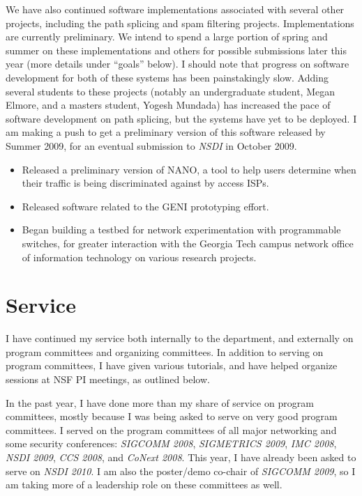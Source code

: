 \begin{sloppypar}
We have also continued software implementations associated with several
other projects, including the path splicing and spam filtering projects.
Implementations are currently preliminary.  We intend to spend a large
portion of spring and summer on these implementations and others for
possible submissions later this year (more details under ``goals''
below).  I should note that progress on software development for both of
these systems has been painstakingly slow.  Adding several students to
these projects (notably an undergraduate student, Megan Elmore, and a
masters student, Yogesh Mundada) has increased the pace of software
development on path splicing, but the systems have yet to be deployed.
I am making a push to get a preliminary version of this software
released by Summer 2009, for an eventual submission to {\em NSDI} in
October 2009.

\begin{itemize}
\itemsep=-1pt
\item Released a preliminary version of NANO, a tool to help users
determine when their traffic is being discriminated against by access
ISPs.
\item Released software related to the GENI prototyping effort.
\item Began building a testbed for network experimentation with
programmable switches, for greater interaction with the Georgia Tech
campus network office of information technology on various research
projects. 
\end{itemize}

\section*{Service}

I have continued my service both internally to the department, and
externally on program committees and organizing committees.  In addition
to serving on program committees, I have given various tutorials, and
have helped organize sessions at NSF PI meetings, as outlined below. 

In the past year, I have done more than my share of service on program
committees, mostly because I was being asked to serve on very good
program committees. I served on the program committees of all major
networking and some security conferences: {\em SIGCOMM 2008}, {\em
SIGMETRICS 2009}, {\em IMC 2008}, {\em NSDI 2009}, {\em CCS 2008}, and
{\em CoNext 2008}.  This year, I have already been asked to serve on
{\em NSDI 2010}.  I am also the poster/demo co-chair of {\em SIGCOMM
2009}, so I am taking more of a leadership role on these committees as
well.


\end{sloppypar}
